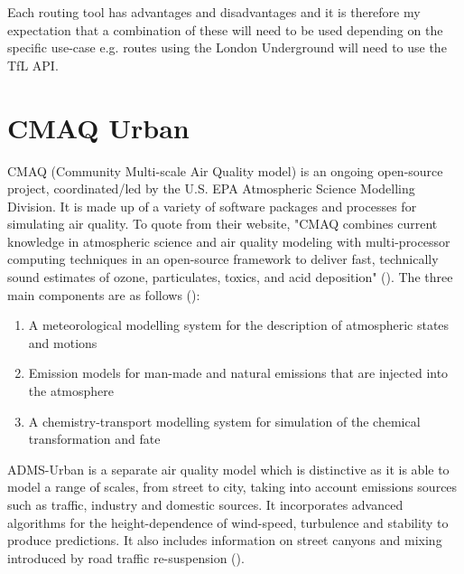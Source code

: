 Each routing tool has advantages and disadvantages and it is therefore my expectation that a combination of these will need to be used depending on the specific use-case e.g. routes using the London Underground will need to use the TfL API.


\section{CMAQ Urban}
\label{sec:cmaq_urban}

CMAQ (Community Multi-scale Air Quality model) is an ongoing open-source project, coordinated/led by the U.S. EPA Atmospheric Science Modelling Division. It is made up of a variety of software packages and processes for simulating air quality. To quote from their website, "CMAQ combines current knowledge in atmospheric science and air quality modeling with multi-processor computing techniques in an open-source framework to deliver fast, technically sound estimates of ozone, particulates, toxics, and acid deposition" (\cite{UnitedStatesEnvironmentalProtectionAgency2014}). The three main components are as follows (\cite{CMASCentre}):

\begin{enumerate}
\item A meteorological modelling system for the description of atmospheric states and motions
\item Emission models for man-made and natural emissions that are injected into the atmosphere
\item A chemistry-transport modelling system for simulation of the chemical transformation and fate
\end{enumerate}

ADMS-Urban is a separate air quality model which is distinctive as it is able to model a range of scales, from street to city, taking into account emissions sources such as traffic, industry and domestic sources. It incorporates advanced algorithms for the height-dependence of wind-speed, turbulence and stability to produce predictions. It also includes information on street canyons and mixing introduced by road traffic re-suspension  (\cite{CambridgeEnvironmentalResearchCounsultantsCERC2014a}).

